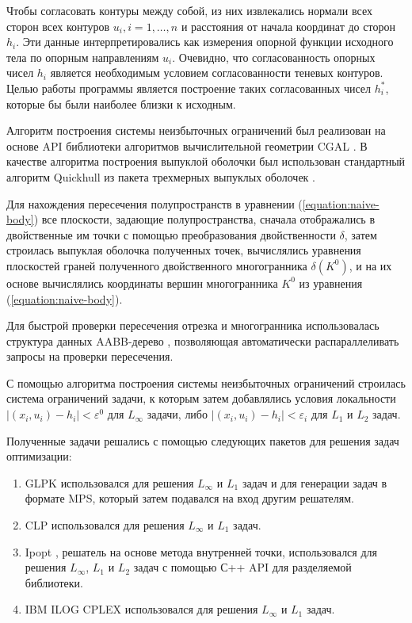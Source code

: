 \documentclass[a4paper, 10pt]{article}
\theoremstyle{definition}
\theoremstyle{plain}
\theoremstyle{plain}
\begin{document}
Чтобы согласовать контуры между собой, из них извлекались нормали всех сторон
всех контуров $u_{i}, i = 1, \ldots, n$ и расстояния от начала координат до
сторон $h_{i}$. Эти данные интерпретировались как измерения опорной функции
исходного тела по опорным направлениям $u_{i}$. Очевидно, что согласованность
опорных чисел $h_{i}$ является необходимым условием согласованности теневых
контуров. Целью работы программы является построение таких согласованных чисел
$h^{*}_{i}$, которые бы были наиболее близки к исходным.

Алгоритм построения системы неизбыточных ограничений был реализован на
основе API библиотеки алгоритмов вычислительной геометрии CGAL \cite{cgal}. В 
качестве алгоритма построения выпуклой оболочки был использован стандартный
алгоритм Quickhull \cite{Barber:1996:QAC:235815.235821} из пакета трехмерных
выпуклых оболочек \cite{cgal:hs-ch3-15a}.

Для нахождения пересечения
полупространств в уравнении (\ref{equation:naive-body}) все плоскости, задающие
полупространства, сначала отображались в двойственные им точки с помощью 
преобразования двойственности $\delta$, затем строилась выпуклая оболочка
полученных точек, вычислялись уравнения плоскостей граней полученного
двойственного многогранника $\delta(K^{0})$, и на их основе
вычислялись координаты вершин многогранника $K^{0}$ из уравнения
(\ref{equation:naive-body}).

Для быстрой проверки пересечения
отрезка и многогранника использовалась структура данных AABB-дерево
\cite{cgal:atw-aabb-15a}, позволяющая автоматически распараллеливать запросы
на проверки пересечения.

С помощью алгоритма построения системы неизбыточных ограничений строилась
система ограничений задачи, к которым затем добавлялись условия локальности
$|(x_{i}, u_{i}) - h_{i}| < \varepsilon^{0}$ для $L_{\infty}$ задачи, либо
$|(x_{i}, u_{i}) - h_{i}| < \varepsilon_{i}$ для $L_{1}$ и $L_{2}$ задач.

Полученные задачи решались с помощью следующих пакетов для решения задач
оптимизации:

\begin{enumerate}
 \item GLPK \cite{glpk} использовался для решения $L_{\infty}$ и $L_{1}$ задач
 и для генерации задач в формате MPS, который затем подавался на вход другим
 решателям.
 \item CLP \cite{clp} использовался для решения $L_{\infty}$ и $L_{1}$ задач.
 \item Ipopt \cite{ipopt}, решатель на основе метода внутренней точки,
 использовался для решения $L_{\infty}$, $L_{1}$ и $L_{2}$ задач с помощью С++
 API для разделяемой библиотеки.
 \item IBM ILOG CPLEX \cite{cplex} использовался для решения
 $L_{\infty}$ и $L_{1}$ задач.
\end{enumerate}
\end{document}
